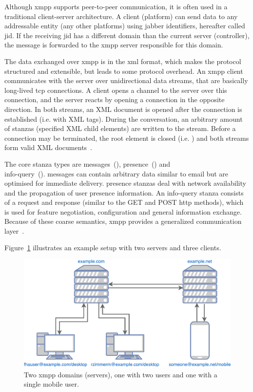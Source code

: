 Although \gls{xmpp} supports peer-to-peer communication, it is often used in a traditional client-server architecture.
A client (\gls{platform}) can send data to any addressable entity (any other \glspl{platform}) using \Gls{jabber} identifiers, hereafter called \gls{jid}.
If the receiving \gls{jid} has a different domain than the current server (\gls{controller}), the message is forwarded to the \gls{xmpp} server responsible for this domain.~\cite{rfc6120}

The data exchanged over \gls{xmpp} is in the \gls{xml} format, which makes the protocol structured and extensible, but leads to some protocol overhead.
An \gls{xmpp} client communicates with the server over unidirectional data streams, that are basically long-lived \gls{tcp} connections.
A client opens a channel to the server over this connection, and the server reacts by opening a connection in the opposite direction.
In both streams, an XML document is opened after the connection is established (i.e. with  XML tags).
During the conversation, an arbitrary amount of \glspl{stanza} (specified XML child elements) are written to the stream.
Before a connection may be terminated, the root element is closed (i.e. ) and both streams form valid XML documents~\cite{rfc6120}\cite{professional-xmpp}.

The core \gls{stanza} types are \glspl{message}~(), \gls{presence}~() and\\
\gls{info-query}~().
\Glspl{message} can contain arbitrary data similar to email but are optimised for immediate delivery.
\Gls{presence} \glspl{stanza} deal with network availability and the propagation of user presence information.
An \gls{info-query} \gls{stanza} consists of a request and response (similar to the GET and POST \gls{http} methods), which is used for feature negotiation, configuration and general information exchange.
Because of these coarse semantics, \gls{xmpp} provides a generalized communication layer~\cite{rfc6120}\cite{ieee-xplore-stream-xml-xmpp}.

Figure~\ref{fig:xmpp-overview} illustrates an example setup with two servers and three clients.

\begin{figure}[h]
	\centering
	\includegraphics[width=0.8\linewidth]{resources/xmpp_overview.pdf}
	\caption[XMPP example overview]{Two \gls{xmpp} domains (servers), one with two users and one with a single mobile user.}
	\label{fig:xmpp-overview}
\end{figure}

